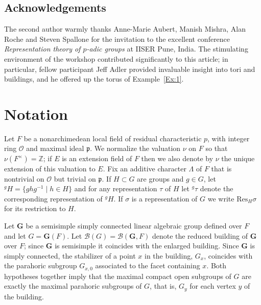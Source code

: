 \documentclass[12pt]{amsart}
\newcommand{\Res}{\mathrm{Res}} %
\newcommand{\R}{{\scriptstyle{\mathcal{O}}}}
\newcommand{\PP}{\mathfrak{p}}
\newcommand{\ratk}{F}
\newcommand{\extk}{E}
\newcommand{\Z}{\mathbb{Z}} %
\newcommand{\GG}{\mathbf{G}} %
\newcommand{\buil}{\mathcal{B}}
\theoremstyle{plain}
\theoremstyle{definition}
\theoremstyle{remark}
\numberwithin{equation}{section}
\numberwithin{figure}{section}
\begin{document}
\subsection*{Acknowledgements} The second author warmly thanks Anne-Marie Aubert, Manish Mishra, Alan Roche and Steven Spallone for the invitation to the excellent conference \emph{Representation theory of $p$-adic groups} at IISER Pune, India.   The stimulating environment of the workshop contributed significantly to this article; in particular, fellow participant Jeff Adler provided invaluable insight into tori and buildings, and he offered up the torus of Example~\ref{Ex:1}.

\section{Notation}\label{1}

Let $\ratk$ be a nonarchimedean local field of residual characteristic $p$, with integer ring $\R$ and maximal ideal $\PP$.  We normalize the valuation 
$\nu$ on $\ratk$ so that $\nu(\ratk^\times) =\Z$; if $\extk$ is an extension field of $\ratk$ then we also denote by $\nu$ the unique extension of this valuation to $\extk$.  Fix an additive character $\Lambda$ of $\ratk$ that is nontrivial on $\R$ but trivial on $\PP$.  If $H\subset G$ are groups and $g\in G$, let ${}^gH = \{ghg^{-1}\mid h\in H\}$ and for any representation $\tau$ of $H$ let ${}^g\tau$ denote the corresponding representation of ${}^gH$.  If $\sigma$ is a representation of $G$ we write $\Res_H\sigma$ for its restriction to $H$.

Let $\GG$ be a semisimple simply connected linear algebraic group defined over $\ratk$ and let $G = \GG(\ratk)$.   Let $\buil(G)=\buil(\GG,\ratk)$ denote the reduced building of $\GG$ over $\ratk$; since $\GG$ is semisimple it coincides with the enlarged building.  Since $\GG$ is simply connected, the stabilizer of a point $x$ in the building, $G_x$, coincides with the parahoric subgroup $G_{x,0}$ associated to the facet containing $x$.  Both hypotheses together imply that the maximal compact open subgroups of $G$ are exactly the maximal parahoric subgroups of $G$, that is, $G_y$ for each vertex $y$ of the building.
\end{document}
